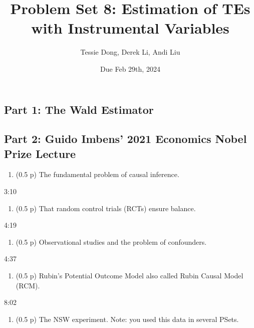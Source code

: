 \documentclass[
]{article}
\title{Problem Set 8: Estimation of TEs with Instrumental Variables}
\author{Tessie Dong, Derek Li, Andi Liu}
\date{Due Feb 29th, 2024}
\providecommand{\tightlist}{%
  \setlength{\itemsep}{0pt}\setlength{\parskip}{0pt}}
\begin{document}
\maketitle

\hypertarget{part-1-the-wald-estimator}{%
\subsection{Part 1: The Wald
Estimator}\label{part-1-the-wald-estimator}}

\hypertarget{part-2-guido-imbens-2021-economics-nobel-prize-lecture}{%
\subsection{Part 2: Guido Imbens' 2021 Economics Nobel Prize
Lecture}\label{part-2-guido-imbens-2021-economics-nobel-prize-lecture}}

\begin{enumerate}
\def\labelenumi{\arabic{enumi}.}
\setcounter{enumi}{7}
\tightlist
\item
  (0.5 p) The fundamental problem of causal inference.
\end{enumerate}

3:10

\begin{enumerate}
\def\labelenumi{\arabic{enumi}.}
\setcounter{enumi}{8}
\tightlist
\item
  (0.5 p) That random control trials (RCTs) ensure balance.
\end{enumerate}

4:19

\begin{enumerate}
\def\labelenumi{\arabic{enumi}.}
\setcounter{enumi}{9}
\tightlist
\item
  (0.5 p) Observational studies and the problem of confounders.
\end{enumerate}

4:37

\begin{enumerate}
\def\labelenumi{\arabic{enumi}.}
\setcounter{enumi}{10}
\tightlist
\item
  (0.5 p) Rubin's Potential Outcome Model also called Rubin Causal Model
  (RCM).
\end{enumerate}

8:02

\begin{enumerate}
\def\labelenumi{\arabic{enumi}.}
\setcounter{enumi}{11}
\tightlist
\item
  (0.5 p) The NSW experiment. Note: you used this data in several PSets.
\end{enumerate}
\end{document}
